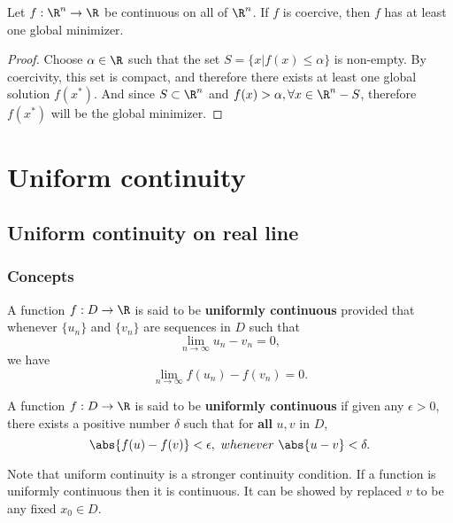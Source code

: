 \begin{refsection}
\begin{theorem}\label{ch:calculus:th:WeierstrassCoerciveFunc}
Let $f:\R^n\to \R$ be continuous on all of $\R^n$. If $f$ is coercive, then $f$ has at least one global minimizer.
\end{theorem}
\begin{proof}
Choose $\alpha \in \R$ such that the set $S= \{x|f(x)\leq \alpha \}$ is non-empty. By coercivity, this set is compact, and therefore there exists at least one global solution $f(x^*)$. And since $S\subset \R^n$ and $f(x) > \alpha,\forall x\in \R^n-S$, therefore $f(x^*)$ will be the global minimizer. 
\end{proof}



\section{Uniform continuity}

\subsection{Uniform continuity on real line}
\subsubsection{Concepts}
\begin{definition}\cite[67]{fitzpatrick2006advanced}
A function $f:D\to \R$ is said to be \textbf{uniformly continuous} provided that whenever $\{u_n\}$ and $\{v_n\}$ are sequences in $D$ such that
$$\lim_{n\to \infty} u_n - v_n = 0,$$
we have
$$\lim_{n\to \infty} f(u_n) - f(v_n) = 0.$$
\end{definition}

\begin{definition}\cite[73]{fitzpatrick2006advanced}
A function $f:D\to \R$ is said to be \textbf{uniformly continuous} if given  any $\epsilon > 0$, there exists a positive number $\delta$ such that for \textbf{all} $u,v$ in $D$, 
$$\abs{f(u)-f(v)} < \epsilon, ~whenever~ \abs{u - v} < \delta.$$
\end{definition}




\begin{note}
Note that uniform continuity is a stronger continuity condition. If a function is uniformly continuous then it is continuous. It can be showed by replaced $v$ to be any fixed $x_0\in D$.	
\end{note}


\end{refsection}
